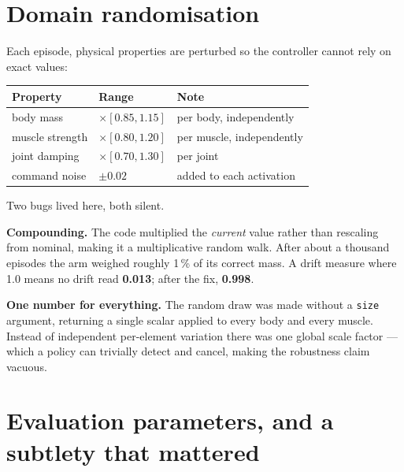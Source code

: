 \section{Domain randomisation}

Each episode, physical properties are perturbed so the controller cannot rely on
exact values:

\begin{center}
\begin{tabular}{@{} L{4.4cm} C{3.0cm} L{6.6cm} @{}}
\toprule
\textbf{Property} & \textbf{Range} & \textbf{Note} \\
\midrule
body mass & $\times[0.85, 1.15]$ & per body, independently \\
muscle strength & $\times[0.80, 1.20]$ & per muscle, independently \\
joint damping & $\times[0.70, 1.30]$ & per joint \\
command noise & $\pm 0.02$ & added to each activation \\
\bottomrule
\end{tabular}
\end{center}

\begin{trap}
Two bugs lived here, both silent.

\textbf{Compounding.} The code multiplied the \emph{current} value rather than
rescaling from nominal, making it a multiplicative random walk. After about a
thousand episodes the arm weighed roughly 1\,\% of its correct mass. A drift
measure where 1.0 means no drift read \textbf{0.013}; after the fix, \textbf{0.998}.

\textbf{One number for everything.} The random draw was made without a
\texttt{size} argument, returning a single scalar applied to every body and every
muscle. Instead of independent per-element variation there was one global scale
factor --- which a policy can trivially detect and cancel, making the robustness
claim vacuous.
\end{trap}

\section{Evaluation parameters, and a subtlety that mattered}
\label{sec:evaldefects2}

